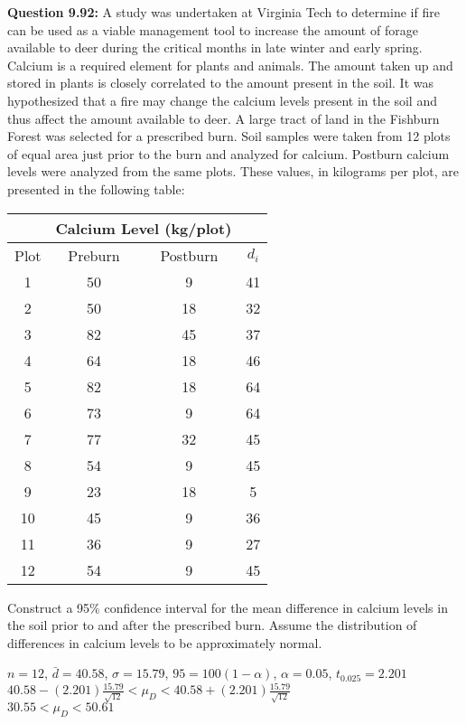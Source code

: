 \documentclass{article}
\begin{document}
\textbf{Question 9.92:}
A study was undertaken at Virginia Tech to determine if 
fire can be used as a viable management tool to increase 
the amount of forage available to deer during the critical 
months in late winter and early spring. Calcium is a 
required element for plants and animals. The amount taken 
up and stored in plants is closely correlated to the amount 
present in the soil. It was hypothesized that a fire may 
change the calcium levels present in the soil and thus 
affect the amount available to deer. A large tract of land 
in the Fishburn Forest was selected for a prescribed burn. 
Soil samples were taken from 12 plots of equal area just 
prior to the burn and analyzed for calcium. Postburn 
calcium levels were analyzed from the same plots. These 
values, in kilograms per plot, are presented in the 
following table:
\begin{center}
\begin{tabular}{c c c c}
    & \multicolumn{2}{c}{Calcium Level (kg/plot)}\\
    \hline
    Plot & Preburn & Postburn & $d_i$\\
    \hline
    1  & 50 & 9  & 41\\
    2  & 50 & 18 & 32\\
    3  & 82 & 45 & 37\\
    4  & 64 & 18 & 46\\
    5  & 82 & 18 & 64\\
    6  & 73 & 9  & 64\\
    7  & 77 & 32 & 45\\
    8  & 54 & 9  & 45\\
    9  & 23 & 18 & 5 \\
    10 & 45 & 9  & 36\\
    11 & 36 & 9  & 27\\
    12 & 54 & 9  & 45\\
\end{tabular}
\end{center}
Construct a 95\% confidence interval for the mean 
difference in calcium levels in the soil prior to and 
after the prescribed burn. Assume the distribution of 
differences in calcium levels to be approximately normal.
\begin{description}
    \item $n=12$, $\bar{d}=40.58$, $\sigma=15.79$, $95=100(1-\alpha)$, $\alpha=0.05$,
    $t_{0.025}=2.201$\\
    $40.58-(2.201)\frac{15.79}{\sqrt{12}} < \mu_D < 40.58+(2.201)\frac{15.79}{\sqrt{12}}$\\
    \boldmath$30.55 < \mu_D < 50.61$
\end{description}
\end{document}
